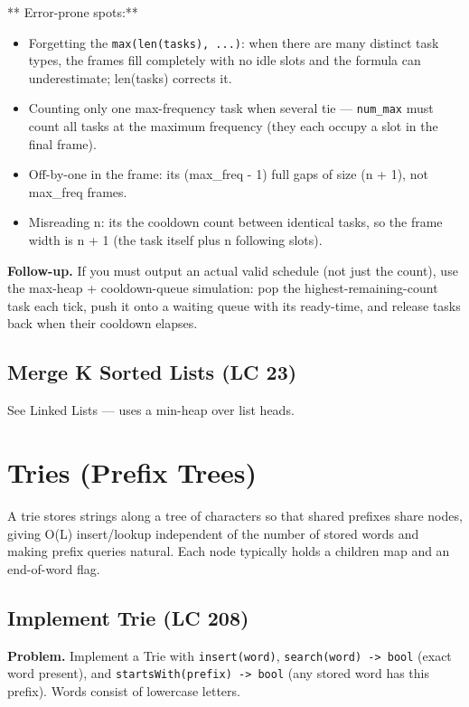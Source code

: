 \documentclass[11pt]{article}
\providecommand{\tightlist}{\setlength{\itemsep}{1pt}\setlength{\parskip}{0pt}}
\begin{document}
** Error-prone spots:**

\begin{itemize}
\tightlist
\item
  Forgetting the \texttt{max(len(tasks),\ ...)}: when there are many distinct task types, the frames fill completely with no idle slots and the formula can underestimate; len(tasks) corrects it.
\item
  Counting only one max-frequency task when several tie --- \texttt{num\_max} must count all tasks at the maximum frequency (they each occupy a slot in the final frame).
\item
  Off-by-one in the frame: it\textquotesingle s (max\_freq - 1) full gaps of size (n + 1), not max\_freq frames.
\item
  Misreading n: it\textquotesingle s the cooldown count between identical tasks, so the frame width is n + 1 (the task itself plus n following slots).
\end{itemize}

\textbf{Follow-up.} If you must output an actual valid schedule (not just the count), use the max-heap + cooldown-queue simulation: pop the highest-remaining-count task each tick, push it onto a waiting queue with its ready-time, and release tasks back when their cooldown elapses.

\subsection{Merge K Sorted Lists (LC 23)}\label{merge-k-sorted-lists-lc-23-1}

See Linked Lists --- uses a min-heap over list heads.

\section{Tries (Prefix Trees)}\label{tries-prefix-trees}

A trie stores strings along a tree of characters so that shared prefixes share nodes, giving O(L) insert/lookup independent of the number of stored words and making prefix queries natural. Each node typically holds a children map and an end-of-word flag.

\subsection{Implement Trie (LC 208)}\label{implement-trie-lc-208}

\textbf{Problem.} Implement a Trie with \texttt{insert(word)}, \texttt{search(word)\ -\textgreater{}\ bool} (exact word present), and \texttt{startsWith(prefix)\ -\textgreater{}\ bool} (any stored word has this prefix). Words consist of lowercase letters.
\end{document}
